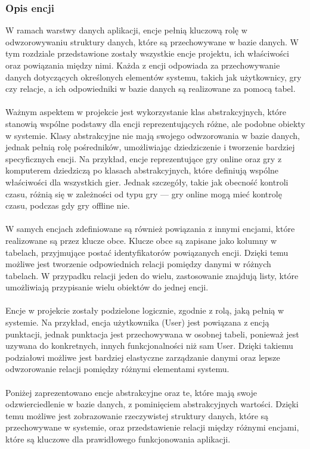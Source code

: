 \documentclass[12pt,a4paper]{article}
\begin{document}
\subsubsection{Opis encji}
W ramach warstwy danych aplikacji, encje pełnią kluczową rolę w odwzorowywaniu struktury danych, które są przechowywane w bazie danych. W tym rozdziale przedstawione zostały wszystkie encje projektu, ich właściwości oraz powiązania między nimi. Każda z encji odpowiada za przechowywanie danych dotyczących określonych elementów systemu, takich jak użytkownicy, gry czy relacje, a ich odpowiedniki w bazie danych są realizowane za pomocą tabel.
\\\\
Ważnym aspektem w projekcie jest wykorzystanie klas abstrakcyjnych, które stanowią wspólne podstawy dla encji reprezentujących różne, ale podobne obiekty w systemie. Klasy abstrakcyjne nie mają swojego odwzorowania w bazie danych, jednak pełnią rolę pośredników, umożliwiając dziedziczenie i tworzenie bardziej specyficznych encji. Na przykład, encje reprezentujące gry online oraz gry z komputerem dziedziczą po klasach abstrakcyjnych, które definiują wspólne właściwości dla wszystkich gier. Jednak szczegóły, takie jak obecność kontroli czasu, różnią się w zależności od typu gry — gry online mogą mieć kontrolę czasu, podczas gdy gry offline nie.
\\\\
W samych encjach zdefiniowane są również powiązania z innymi encjami, które realizowane są przez klucze obce. Klucze obce są zapisane jako kolumny w tabelach, przyjmujące postać identyfikatorów powiązanych encji. Dzięki temu możliwe jest tworzenie odpowiednich relacji pomiędzy danymi w różnych tabelach. W przypadku relacji jeden do wielu, zastosowanie znajdują listy, które umożliwiają przypisanie wielu obiektów do jednej encji.
\\\\
Encje w projekcie zostały podzielone logicznie, zgodnie z rolą, jaką pełnią w systemie. Na przykład, encja użytkownika (User) jest powiązana z encją punktacji, jednak punktacja jest przechowywana w osobnej tabeli, ponieważ jest uzywana do konkretnych, innych funkcjonalności niż sam User. Dzięki takiemu podziałowi możliwe jest bardziej elastyczne zarządzanie danymi oraz lepsze odwzorowanie relacji pomiędzy różnymi elementami systemu.
\\\\
Poniżej zaprezentowano encje abstrakcyjne oraz te, które mają swoje odzwierciedlenie w bazie danych, z pominięciem abstrakcyjnych wartości. Dzięki temu możliwe jest zobrazowanie rzeczywistej struktury danych, które są przechowywane w systemie, oraz przedstawienie relacji między różnymi encjami, które są kluczowe dla prawidłowego funkcjonowania aplikacji.
\end{document}
